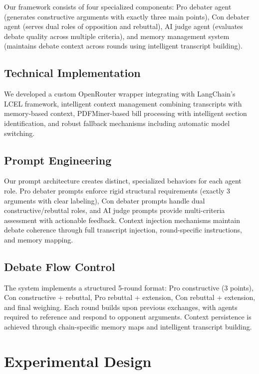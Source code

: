 \documentclass{article}
\begin{document}
Our framework consists of four specialized components: Pro debater agent (generates constructive arguments with exactly three main points), Con debater agent (serves dual roles of opposition and rebuttal), AI judge agent (evaluates debate quality across multiple criteria), and memory management system (maintains debate context across rounds using intelligent transcript building).

\subsection{Technical Implementation}

We developed a custom OpenRouter wrapper integrating with LangChain's LCEL framework, intelligent context management combining transcripts with memory-based context, PDFMiner-based bill processing with intelligent section identification, and robust fallback mechanisms including automatic model switching.

\subsection{Prompt Engineering}

Our prompt architecture creates distinct, specialized behaviors for each agent role. Pro debater prompts enforce rigid structural requirements (exactly 3 arguments with clear labeling), Con debater prompts handle dual constructive/rebuttal roles, and AI judge prompts provide multi-criteria assessment with actionable feedback. Context injection mechanisms maintain debate coherence through full transcript injection, round-specific instructions, and memory mapping.

\subsection{Debate Flow Control}

The system implements a structured 5-round format: Pro constructive (3 points), Con constructive + rebuttal, Pro rebuttal + extension, Con rebuttal + extension, and final weighing. Each round builds upon previous exchanges, with agents required to reference and respond to opponent arguments. Context persistence is achieved through chain-specific memory maps and intelligent transcript building.

\section{Experimental Design}
\end{document}
